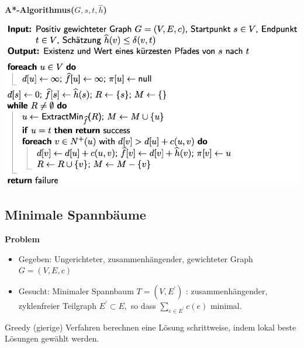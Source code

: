 \vspace{-4pt}
\begin{sectionbox}
\textbf{A*-Algorithmus($G, s, t, \hat{h}$)}
\begin{center}
    \includegraphics[width=\columnwidth]{img/AStar.png}
\end{center}

\end{sectionbox}
\vspace{-4pt}
\begin{sectionbox}
\subsection{Minimale Spannbäume}\smallskip
\textbf{Problem}\par
\begin{itemize}
    \item Gegeben: Ungerichteter, zusammenhängender, gewichteter Graph $G=(V, E, c)$
    \item Gesucht: Minimaler Spannbaum $T=\left(V, E^{\prime}\right)$ : zusammenhängender, zyklenfreier Teilgraph $E^{\prime} \subset E,$ so dass $\sum_{e \in E^{\prime}} c(e)$ minimal.
\end{itemize}
Greedy (gierige) Verfahren berechnen eine Lösung schrittweise, indem lokal beste Lösungen gewählt werden.\par
\end{sectionbox}
\vspace{-4pt}
